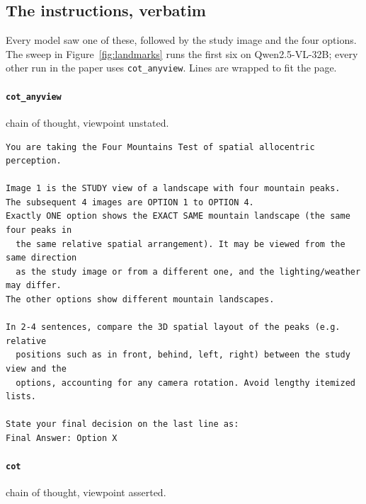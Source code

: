 \subsection{The instructions, verbatim}
\label{app:prompts}

Every model saw one of these, followed by the study image and the four options.
The sweep in Figure~\ref{fig:landmarks} runs the first six on Qwen2.5-VL-32B;
every other run in the paper uses \texttt{cot\_anyview}. Lines are wrapped to fit the page.

\paragraph{\texttt{cot\_anyview}} chain of thought, viewpoint unstated.

\begin{footnotesize}
\begin{verbatim}
You are taking the Four Mountains Test of spatial allocentric perception.

Image 1 is the STUDY view of a landscape with four mountain peaks.
The subsequent 4 images are OPTION 1 to OPTION 4.
Exactly ONE option shows the EXACT SAME mountain landscape (the same four peaks in
  the same relative spatial arrangement). It may be viewed from the same direction
  as the study image or from a different one, and the lighting/weather may differ.
The other options show different mountain landscapes.

In 2-4 sentences, compare the 3D spatial layout of the peaks (e.g. relative
  positions such as in front, behind, left, right) between the study view and the
  options, accounting for any camera rotation. Avoid lengthy itemized lists.

State your final decision on the last line as:
Final Answer: Option X
\end{verbatim}
\end{footnotesize}

\paragraph{\texttt{cot}} chain of thought, viewpoint asserted.

